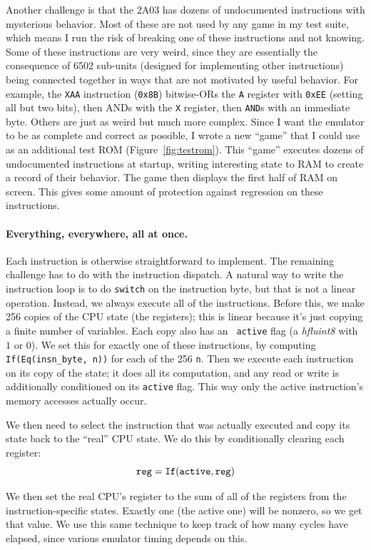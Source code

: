\documentclass[twocolumn]{article}
\begin{document}
Another challenge is that the 2A03 has dozens of undocumented
instructions with mysterious behavior. Most of these are not used by
any game in my test suite, which means I run the risk of breaking one
of these instructions and not knowing. Some of these instructions are
very weird, since they are essentially the consequence of 6502
sub-units (designed for implementing other instructions) being
connected together in ways that are not motivated by useful behavior.
For example, the {\tt XAA} instruction ({\tt 0x8B}) bitwise-ORs the
{\tt A} register with {\tt 0xEE} (setting all but two bits), then ANDs
with the {\tt X} register, then {\tt AND}s with an immediate byte.
Others are just as weird but much more complex. Since I want the
emulator to be as complete and correct as possible, I wrote a new
``game'' that I could use as an additional test ROM
(Figure~\ref{fig:testrom}). This ``game'' executes dozens of
undocumented instructions at startup, writing interesting state to RAM
to create a record of their behavior. The game then displays the first
half of RAM on screen. This gives some amount of protection against
regression on these instructions.

\paragraph{Everything, everywhere, all at once.}
Each instruction is otherwise straightforward to implement. The
remaining challenge has to do with the instruction dispatch. A natural
way to write the instruction loop is to do {\tt switch} on the
instruction byte, but that is not a linear operation. Instead, we
always execute all of the instructions. Before this, we make 256
copies of the CPU state (the registers); this is linear because it's
just copying a finite number of variables. Each copy also has an {\tt
  active} flag (a {\it hfluint8} with $1$ or $0$). We set this for
exactly one of these instructions, by computing
\verb+If(Eq(insn_byte, n))+ for each of the 256 {\tt n}. Then we
execute each instruction on its copy of the state; it does all its
computation, and any read or write is additionally conditioned on
its {\tt active} flag. This way only the active instruction's memory
accesses actually occur.

We then need to select the instruction that was actually executed
and copy its state back to the ``real'' CPU state. We do this by
conditionally clearing each register:
%
$${\tt reg = If(active, reg)}$$

We then set the real CPU's register to the sum of all of the registers
from the instruction-specific states. Exactly one (the active one)
will be nonzero, so we get that value. We use this same technique to
keep track of how many cycles have elapsed, since various emulator
timing depends on this.
\end{document}
